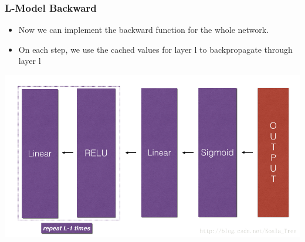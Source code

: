 \documentclass[12pt,a4paper]{article}
\begin{document}
		\subsubsection{L-Model Backward}
		\begin{itemize}
			\item Now we can implement the backward function for the whole network.
			\item On each step, we use the cached values for layer l to backpropagate through layer l
		\end{itemize}
		\qquad\qquad\quad\includegraphics[scale=0.8]{image_9}
		\newpage
\end{document}

